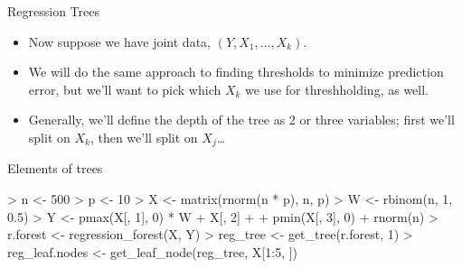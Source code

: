 \documentclass[xcolor={table}, handout]{beamer}
\begin{document}
\begin{frame}{Regression Trees}

\begin{itemize}
\item Now suppose we have joint data, $(Y,X_1, \dots, X_k)$.\pause
\item We will do the same approach to finding thresholds to minimize prediction error, but we'll want to pick which $X_k$ we use for threshholding, as well. \pause
\item Generally, we'll define the depth of the tree as 2 or three variables; first we'll split on $X_k$, then we'll split on $X_j$\dots
\end{itemize}


\end{frame}


\begin{frame}[fragile]{Elements of trees}

\begin{Schunk}
\begin{Sinput}
> n <- 500
> p <- 10
> X <- matrix(rnorm(n * p), n, p)
> W <- rbinom(n, 1, 0.5)
> Y <- pmax(X[, 1], 0) * W + X[, 2] +
+   pmin(X[, 3], 0) + rnorm(n)
> r.forest <- regression_forest(X, Y)
> reg_tree <- get_tree(r.forest, 1)
> reg_leaf.nodes <- get_leaf_node(reg_tree, X[1:5, ])
\end{Sinput}
\end{Schunk}



\end{frame}


\end{document}
